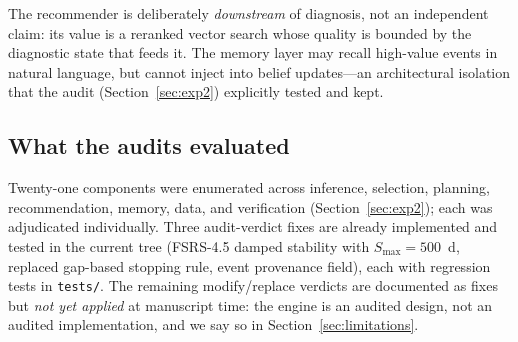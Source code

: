 \documentclass[11pt]{article}
\begin{document}
The recommender is deliberately \emph{downstream} of diagnosis, not an independent claim: its value is a reranked vector search whose quality is bounded by the diagnostic state that feeds it. The memory layer may recall high-value events in natural language, but cannot inject into belief updates---an architectural isolation that the audit (Section~\ref{sec:exp2}) explicitly tested and kept.

\subsection{What the audits evaluated}
Twenty-one components were enumerated across inference, selection, planning, recommendation, memory, data, and verification (Section~\ref{sec:exp2}); each was adjudicated individually. Three audit-verdict fixes are already implemented and tested in the current tree (FSRS-4.5 damped stability with $S_{\max}=500$~d, replaced gap-based stopping rule, event provenance field), each with regression tests in \texttt{tests/}. The remaining modify/replace verdicts are documented as fixes but \emph{not yet applied} at manuscript time: the engine is an audited design, not an audited implementation, and we say so in Section~\ref{sec:limitations}.












\end{document}
